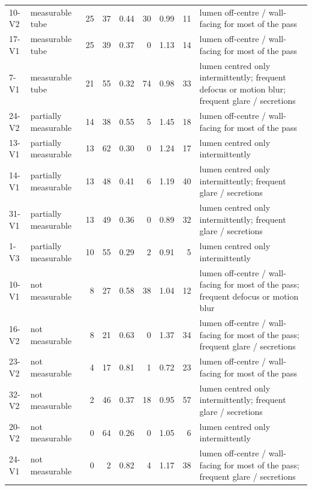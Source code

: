 \begin{tabular}{llrrrrrrl}
10-V2 & measurable tube & 25 & 37 & 0.44 & 30 & 0.99 & 11 & lumen off-centre / wall-facing for most of the pass \\
17-V1 & measurable tube & 25 & 39 & 0.37 & 0 & 1.13 & 14 & lumen off-centre / wall-facing for most of the pass \\
7-V1 & measurable tube & 21 & 55 & 0.32 & 74 & 0.98 & 33 & lumen centred only intermittently; frequent defocus or motion blur; frequent glare / secretions \\
24-V2 & partially measurable & 14 & 38 & 0.55 & 5 & 1.45 & 18 & lumen off-centre / wall-facing for most of the pass \\
13-V1 & partially measurable & 13 & 62 & 0.30 & 0 & 1.24 & 17 & lumen centred only intermittently \\
14-V1 & partially measurable & 13 & 48 & 0.41 & 6 & 1.19 & 40 & lumen centred only intermittently; frequent glare / secretions \\
31-V1 & partially measurable & 13 & 49 & 0.36 & 0 & 0.89 & 32 & lumen centred only intermittently; frequent glare / secretions \\
1-V3 & partially measurable & 10 & 55 & 0.29 & 2 & 0.91 & 5 & lumen centred only intermittently \\
10-V1 & not measurable & 8 & 27 & 0.58 & 38 & 1.04 & 12 & lumen off-centre / wall-facing for most of the pass; frequent defocus or motion blur \\
16-V2 & not measurable & 8 & 21 & 0.63 & 0 & 1.37 & 34 & lumen off-centre / wall-facing for most of the pass; frequent glare / secretions \\
23-V2 & not measurable & 4 & 17 & 0.81 & 1 & 0.72 & 23 & lumen off-centre / wall-facing for most of the pass \\
32-V2 & not measurable & 2 & 46 & 0.37 & 18 & 0.95 & 57 & lumen centred only intermittently; frequent glare / secretions \\
20-V2 & not measurable & 0 & 64 & 0.26 & 0 & 1.05 & 6 & lumen centred only intermittently \\
24-V1 & not measurable & 0 & 2 & 0.82 & 4 & 1.17 & 38 & lumen off-centre / wall-facing for most of the pass; frequent glare / secretions \\
\bottomrule
\end{tabular}
